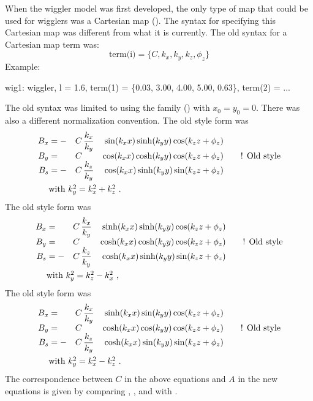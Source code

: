 {When the wiggler model was first developed, the only type of map that could be used for  wigglers was a Cartesian map (). The syntax for specifying this Cartesian
map was different from what it is currently. The old syntax for a Cartesian map term was:
\begin{equation}
  \text{term(i)} = \{C, k_x, k_y, k_z, \phi_z \}
\end{equation}
Example:
\begin{example}
  wig1: wiggler, l = 1.6, 
        term(1) = \{0.03, 3.00, 4.00, 5.00, 0.63\},
        term(2) = ...
\end{example}

The old syntax was limited to using the   family ()
with $x_0 = y_0 = 0$. There was also a different normalization convention. The old style
 form was
\begin{alignat}{5}
  B_x &= -& C \, &\dfrac{k_x}{k_y} & \sin(k_x x) \sinh(k_y y) \cos(\kzz) &\CRNEG
  B_y &=  & C \, &                 & \cos(k_x x) \cosh(k_y y) \cos(\kzz) &\qquad \text{! Old style} \CRNEG
  B_s &= -& C \, &\dfrac{k_z}{k_y} & \cos(k_x x) \sinh(k_y y) \sin(\kzz) &\label{f1} \\
  & \makebox[1pt][l]{with $k_y^2 = k_x^2 + k_z^2$ .} &&&&  \nonumber
\end{alignat}
The old style  form was
\begin{alignat}{5}
  B_x &=  & C \, &\dfrac{k_x}{k_y} & \sinh(k_x x) \sinh(k_y y) \cos(\kzz) &\CRNEG
  B_y &=  & C \, &                 & \cosh(k_x x) \cosh(k_y y) \cos(\kzz) &\qquad \text{! Old style} \CRNEG
  B_s &= -& C \, &\dfrac{k_z}{k_y} & \cosh(k_x x) \sinh(k_y y) \sin(\kzz) &\label{f2} \\
  & \makebox[1pt][l]{with $k_y^2 = k_z^2 - k_x^2$ ,} &&&&  \nonumber
\end{alignat}
The old style  form was
\begin{alignat}{5}
  B_x &=  & C \, &\dfrac{k_x}{k_y} & \sinh(k_x x) \sin(k_y y) \cos(\kzz) &\CRNEG
  B_y &=  & C \, &                 & \cosh(k_x x) \cos(k_y y) \cos(\kzz) &\qquad \text{! Old style} \CRNEG
  B_s &= -& C \, &\dfrac{k_z}{k_y} & \cosh(k_x x) \sin(k_y y) \sin(\kzz) &\label{f3} \\
  & \makebox[1pt][l]{with $k_y^2 = k_x^2 - k_z^2$ .} &&&& \nonumber
\end{alignat}
The correspondence between $C$ in the above equations and $A$ in the new equations is
given by comparing , , and  with .

}
